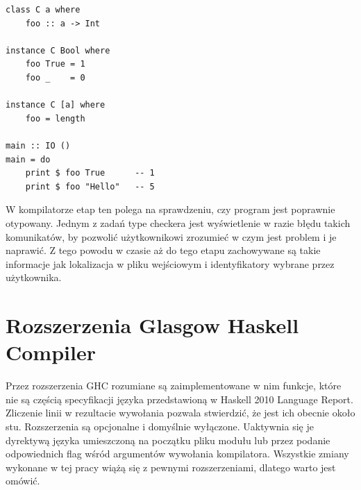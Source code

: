 \begin{lstlisting}[float,label={lst:poly_adhoc},
                   caption={Przykład użycia polimorfizmu ad-hoc w Haskellu.}]
class C a where
    foo :: a -> Int

instance C Bool where
    foo True = 1
    foo _    = 0

instance C [a] where
    foo = length

main :: IO ()
main = do
    print $ foo True      -- 1
    print $ foo "Hello"   -- 5
\end{lstlisting}

W kompilatorze etap ten polega na sprawdzeniu, czy program jest poprawnie otypowany. Jednym z zadań type checkera jest wyświetlenie w razie błędu takich komunikatów, by pozwolić użytkownikowi zrozumieć w czym jest problem i je naprawić. Z tego powodu w czasie aż do tego etapu zachowywane są takie informacje jak lokalizacja w pliku wejściowym i identyfikatory wybrane przez użytkownika.

\section{Rozszerzenia Glasgow Haskell Compiler}\label{sec:rozszerzenia_ghc}

Przez rozszerzenia GHC rozumiane są zaimplementowane w nim funkcje, które nie są częścią specyfikacji języka przedstawioną w Haskell 2010 Language Report. Zliczenie linii w rezultacie wywołania  pozwala stwierdzić, że jest ich obecnie około stu. Rozszerzenia są opcjonalne i domyślnie wyłączone. Uaktywnia się je dyrektywą języka umieszczoną na początku pliku modułu lub przez podanie odpowiednich flag wśród argumentów wywołania kompilatora. Wszystkie zmiany wykonane w tej pracy wiążą się z pewnymi rozszerzeniami, dlatego warto jest omówić.

\label{sec:rodziny_typow}

\label{sec:partial_sigs}
